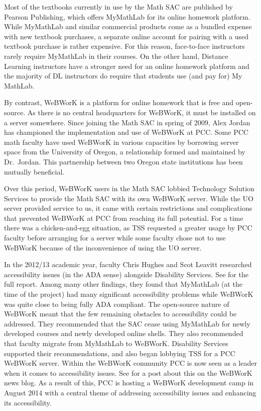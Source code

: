Most of the textbooks currently in use by the Math SAC are published by Pearson Publishing, which offers MyMathLab for its online homework platform. While MyMathLab and similar commercial products come as a bundled expense with new textbook purchases, a separate online account for pairing with a used textbook purchase is rather expensive. For this reason, face-to-face instructors rarely require MyMathLab in their courses. On the other hand, Distance Learning instructors have a stronger need for an online homework platform and the majority of DL instructors do require that students use (and pay for) My MathLab.

By contrast, WeBWorK is a platform for online homework that is free and open-source. As there is no central headquarters for WeBWorK, it must be installed on a server somewhere. Since joining the Math SAC in spring of 2009, Alex Jordan has championed the implementation and use of WeBWorK at PCC. Some PCC math faculty have used WeBWorK in various capacities by borrowing server space from the University of Oregon, a relationship formed and maintained by Dr.\ Jordan. This partnership between two Oregon state institutions has been mutually beneficial. %

Over this period, WeBWorK users in the Math SAC lobbied Technology Solution Services to provide the Math SAC with its own WeBWorK server. While the UO server provided service to us, it came with certain restrictions and complications that prevented WeBWorK at PCC from reaching its full potential. For a time there was a chicken-and-egg situation, as TSS requested a greater usage by PCC faculty before arranging for a server while some faculty chose not to use WeBWorK because of the inconvenience of using the UO server.

In the 2012/13 academic year, faculty Chris Hughes and Scot Leavitt researched accessibility issues (in the ADA sense) alongside Disability Services. See \cite{accessibilityproject} for the full report. Among many other findings, they found that MyMathLab (at the time of the project) had many significant accessibility problems while WeBWorK was quite close to being fully ADA compliant. The open-source nature of WeBWorK meant that the few remaining obstacles to accessibility could be addressed. They recommended that the SAC cease using MyMathLab for newly developed courses and newly developed online shells. They also recommended that faculty migrate from MyMathLab to WeBWorK. Disability Services supported their recommendations, and also began lobbying TSS for a PCC WeBWorK server. Within the WeBWorK community PCC is now seen as a leader when it comes to accessibility issues. See \cite{webworkblog} for a post about this on the WeBWorK news blog. As a result of this, PCC is hosting a WeBWorK development camp in August 2014 with a central theme of addressing accessibility issues and enhancing its accessibility.


